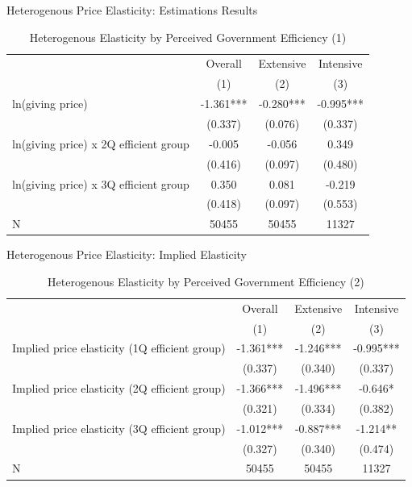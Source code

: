 \documentclass[
  ignorenonframetext,
]{beamer}
\begin{document}
\begin{frame}{Heterogenous Price Elasticity: Estimations Results}
\protect\hypertarget{heterogenous-price-elasticity-estimations-results}{}
\begin{table}

\caption{\label{tab:kableHeteroElasticitySlide1}Heterogenous Elasticity by Perceived Government Efficiency (1)}
\centering
\fontsize{8}{10}\selectfont
\begin{tabular}[t]{lccc}
\toprule
\multicolumn{1}{c}{ } & \multicolumn{1}{c}{Overall} & \multicolumn{1}{c}{Extensive} & \multicolumn{1}{c}{Intensive} \\
\cmidrule(l{3pt}r{3pt}){2-2} \cmidrule(l{3pt}r{3pt}){3-3} \cmidrule(l{3pt}r{3pt}){4-4}
 & (1) & (2) & (3)\\
\midrule
ln(giving price) & -1.361*** & -0.280*** & -0.995***\\
 & (0.337) & (0.076) & (0.337)\\
ln(giving price) x 2Q efficient group & -0.005 & -0.056 & 0.349\\
 & (0.416) & (0.097) & (0.480)\\
ln(giving price) x 3Q efficient group & 0.350 & 0.081 & -0.219\\
 & (0.418) & (0.097) & (0.553)\\
N & 50455 & 50455 & 11327\\
\bottomrule
\end{tabular}
\end{table}
\end{frame}

\begin{frame}{Heterogenous Price Elasticity: Implied Elasticity}
\protect\hypertarget{heterogenous-price-elasticity-implied-elasticity}{}
\begin{table}

\caption{\label{tab:kableHeteroElasticitySlide2}Heterogenous Elasticity by Perceived Government Efficiency (2)}
\centering
\fontsize{8}{10}\selectfont
\begin{tabular}[t]{lccc}
\toprule
\multicolumn{1}{c}{ } & \multicolumn{1}{c}{Overall} & \multicolumn{1}{c}{Extensive} & \multicolumn{1}{c}{Intensive} \\
\cmidrule(l{3pt}r{3pt}){2-2} \cmidrule(l{3pt}r{3pt}){3-3} \cmidrule(l{3pt}r{3pt}){4-4}
 & (1) & (2) & (3)\\
\midrule
Implied price elasticity (1Q efficient group) & -1.361*** & -1.246*** & -0.995***\\
 & (0.337) & (0.340) & (0.337)\\
Implied price elasticity (2Q efficient group) & -1.366*** & -1.496*** & -0.646*\\
 & (0.321) & (0.334) & (0.382)\\
Implied price elasticity (3Q efficient group) & -1.012*** & -0.887*** & -1.214**\\
 & (0.327) & (0.340) & (0.474)\\
N & 50455 & 50455 & 11327\\
\bottomrule
\end{tabular}
\end{table}
\end{frame}
\end{document}
